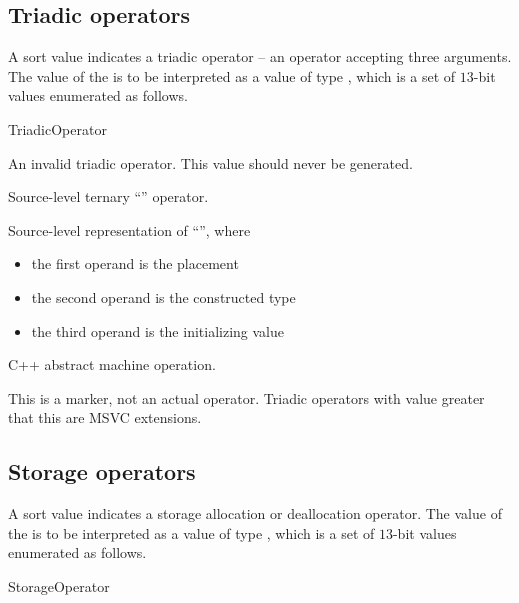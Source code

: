 \subsection{Triadic operators}
\label{sec:ifc:OperatorSort:Triadic}

A sort value  indicates a triadic operator -- 
an operator accepting three arguments.  The
value of the  is to be interpreted as a value of type 
, which is a set of $13$-bit values enumerated as follows.
%
\begin{Enumeration}{TriadicOperator}

	\setcounter{enumi}{1023}
\end{Enumeration}

An invalid triadic operator.  This value should never be generated.

Source-level ternary ``'' operator.

Source-level representation of ``'', where
\begin{itemize}
	\item the first operand is the placement 
	\item the second operand is the constructed type 
	\item the third operand is the initializing value 
\end{itemize}


C++ abstract machine operation.

This is a marker, not an actual operator. Triadic operators with 
value greater that this are MSVC extensions.


\subsection{Storage operators}
\label{sec:ifc:OperatorSort:Storage}

A sort value  indicates a storage 
allocation or deallocation operator.  The
value of the  is to be interpreted as a value of type 
, which is a set of $13$-bit values enumerated as follows.
%
\begin{Enumeration}{StorageOperator}

	\setcounter{enumi}{2013}
\end{Enumeration}

